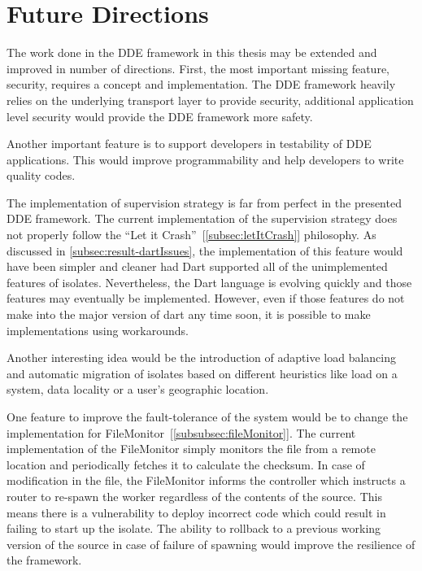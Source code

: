 \chapter{Future Directions}\label{chapter:future_directions}

  The work done in the DDE framework in this thesis may be extended and improved in number of directions. First, the most important missing feature, security, requires a concept and implementation. The DDE framework heavily relies on the underlying transport layer to provide security, additional application level security would provide the DDE framework more safety.

  Another important feature is to support developers in testability of DDE applications. This would improve programmability and help developers to write quality codes.

  The implementation of supervision strategy is far from perfect in the presented DDE framework. The current implementation of the supervision strategy does not properly follow the “Let it Crash”~[\autoref{subsec:letItCrash}] philosophy. As discussed in \autoref{subsec:result-dartIssues}, the implementation of this feature would have been simpler and cleaner had Dart supported all of the unimplemented features of isolates. Nevertheless, the Dart language is evolving quickly and those features may eventually be implemented. However, even if those features do not make into the major version of dart any time soon, it is possible to make implementations using workarounds.

  Another interesting idea would be the introduction of adaptive load balancing and automatic migration of isolates based on different heuristics like load on a system, data locality or a user's geographic location.

  One feature to improve the fault-tolerance of the system would be to change the implementation for FileMonitor~[\autoref{subsubsec:fileMonitor}]. The current implementation of the FileMonitor simply monitors the file from a remote location and periodically fetches it to calculate the checksum. In case of modification in the file, the FileMonitor informs the controller which instructs a router to re-spawn the worker regardless of the contents of the source. This means there is a vulnerability to deploy incorrect code which could result in failing to start up the isolate. The ability to rollback to a previous working version of the source in case of failure of spawning would improve the resilience of the framework.

